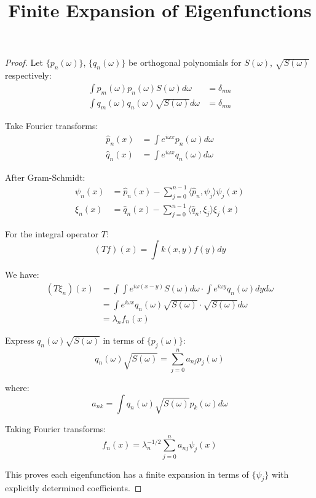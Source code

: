 \documentclass{article}
\title{Finite Expansion of Eigenfunctions}
\author{}
\date{}
\begin{document}
\maketitle

\begin{proof}
Let $\{p_n(\omega)\}$, $\{q_n(\omega)\}$ be orthogonal polynomials for $S(\omega)$, $\sqrt{S(\omega)}$ respectively:
\begin{align*}
\int p_m(\omega)p_n(\omega)S(\omega)d\omega &= \delta_{mn} \\
\int q_m(\omega)q_n(\omega)\sqrt{S(\omega)}d\omega &= \delta_{mn}
\end{align*}

Take Fourier transforms:
\begin{align*}
\hat{p}_n(x) &= \int e^{i\omega x} p_n(\omega) d\omega \\
\hat{q}_n(x) &= \int e^{i\omega x} q_n(\omega) d\omega
\end{align*}

After Gram-Schmidt:
\begin{align*}
\psi_n(x) &= \hat{p}_n(x) - \sum_{j=0}^{n-1} \langle \hat{p}_n, \psi_j \rangle \psi_j(x) \\
\xi_n(x) &= \hat{q}_n(x) - \sum_{j=0}^{n-1} \langle \hat{q}_n, \xi_j \rangle \xi_j(x)
\end{align*}

For the integral operator $T$:
\[ (Tf)(x) = \int k(x,y)f(y)dy \]

We have:
\begin{align*}
(T\xi_n)(x) &= \int \int e^{i\omega(x-y)} S(\omega) d\omega \cdot \int e^{i\omega y} q_n(\omega) dy d\omega \\
&= \int e^{i\omega x} q_n(\omega)\sqrt{S(\omega)} \cdot \sqrt{S(\omega)} d\omega \\
&= \lambda_n f_n(x)
\end{align*}

Express $q_n(\omega)\sqrt{S(\omega)}$ in terms of $\{p_j(\omega)\}$:
\[ q_n(\omega)\sqrt{S(\omega)} = \sum_{j=0}^n a_{nj} p_j(\omega) \]

where:
\[ a_{nk} = \int q_n(\omega)\sqrt{S(\omega)}p_k(\omega)d\omega \]

Taking Fourier transforms:
\[ f_n(x) = \lambda_n^{-1/2}\sum_{j=0}^n a_{nj} \psi_j(x) \]

This proves each eigenfunction has a finite expansion in terms of $\{\psi_j\}$ with explicitly determined coefficients.
\end{proof}
\end{document}
